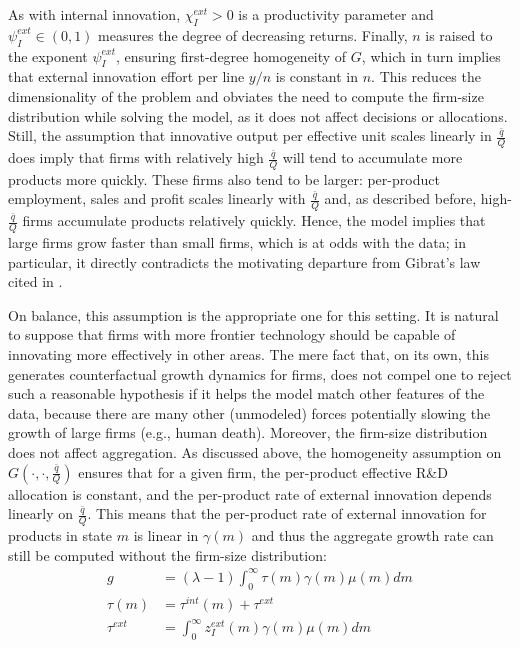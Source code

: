 \documentclass[12pt,english]{article}
\theoremstyle{remark}
\begin{document}
As with internal innovation, $\chi_I^{ext} > 0$ is a productivity parameter and $\psi_I^{ext} \in (0,1)$ measures the degree of decreasing returns. Finally, $n$ is raised to the exponent $\psi_I^{ext}$, ensuring first-degree homogeneity of $G$, which in turn implies that external innovation effort per line $y/n$ is constant in $n$. This reduces the dimensionality of the problem and obviates the need to compute the firm-size distribution while solving the model, as it does not affect decisions or allocations. Still, the assumption that innovative output per effective unit scales linearly in $\frac{\bar{q}}{Q}$ does imply that firms with relatively high $\frac{\bar{q}}{Q}$ will tend to accumulate more products more quickly. These firms also tend to be larger: per-product employment, sales and profit scales linearly with $\frac{\bar{q}}{Q}$ and, as described before, high-$\frac{\bar{q}}{Q}$ firms accumulate products relatively quickly. Hence, the model implies that large firms grow faster than small firms, which is at odds with the data; in particular, it directly contradicts the motivating departure from Gibrat's law cited in \cite{akcigit_growth_2018}. 

On balance, this assumption is the appropriate one for this setting. It is natural to suppose that firms with more frontier technology should be capable of innovating more effectively in other areas. The mere fact that, on its own, this generates counterfactual growth dynamics for firms, does not compel one to reject such a reasonable hypothesis if it helps the model match other features of the data, because there are many other (unmodeled) forces potentially slowing the growth of large firms (e.g., human death).  Moreover, the firm-size distribution does not affect aggregation. As discussed above, the homogeneity assumption on $G(\cdot,\cdot,\frac{\bar{q}}{Q})$ ensures that for a given firm, the per-product effective R\&D allocation is constant, and the per-product rate of external innovation depends linearly on $\frac{\bar{q}}{Q}$. This means that the per-product rate of external innovation for products in state $m$ is linear in $\gamma(m)$ and thus the aggregate growth rate can still be computed without the firm-size distribution: 
\begin{align*}
	g &= (\lambda -1) \int_0^{\infty} \tau(m) \gamma(m) \mu(m) dm \\
	\tau(m) &= \tau^{int} (m) + \tau^{ext} \\
	\tau^{ext} &= \int_0^{\infty} z_I^{ext} (m) \gamma(m) \mu(m) dm
\end{align*}
\end{document}
